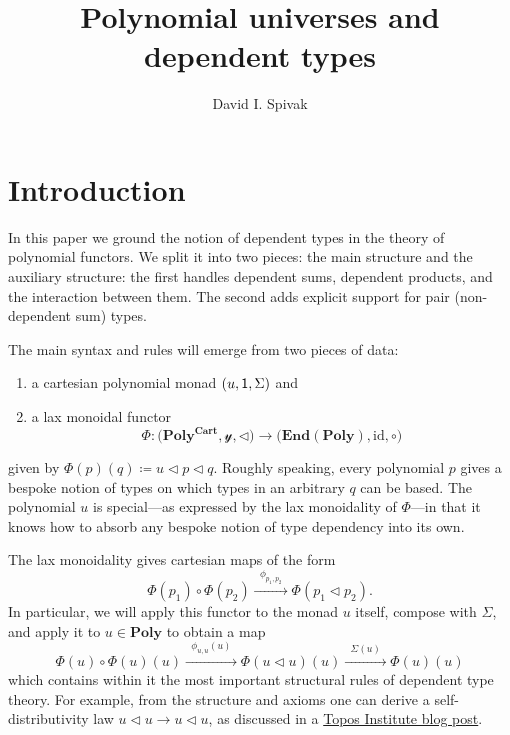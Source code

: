\documentclass[11pt, one side, article]{memoir}
\theoremstyle{definition}
\theoremstyle{plain}
\newcommand{\Cat}[1]{\mathbf{#1}}%
\newcommand{\id}{\mathrm{id}}
\newcommand{\too}{\longrightarrow}
\newcommand{\Too}[1]{\xrightarrow{\;\;#1\;\;}}
\newcommand{\en}{\Cat{End}}
\newcommand{\yon}{\mathcal{y}}
\newcommand{\poly}{\Cat{Poly}}
\newcommand{\polycart}{\poly^{\Cat{Cart}}}
\newcommand{\0}{\textsf{0}}
\newcommand{\1}{\tn{\textsf{1}}}
\newcommand{\tri}{\mathbin{\triangleleft}}
\begin{document}
\title{Polynomial universes and dependent types}

\author{David I. Spivak}

\date{\vspace{-.2in}}

\maketitle

\begin{abstract}
\end{abstract}


\chapter{Introduction}

In this paper we ground the notion of dependent types in the theory of polynomial functors. We split it into two pieces: the main structure and the auxiliary structure: the first handles dependent sums, dependent products, and the interaction between them. The second adds explicit support for pair (non-dependent sum) types. 

The main syntax and rules will emerge from two pieces of data:
\begin{enumerate}
	\item a cartesian polynomial monad $(u,\1,\Sigma)$ and
	\item a lax monoidal functor 
\[
	\Phi\colon\Big(\polycart,\yon,\tri\Big)\too\Big(\en(\poly),\id,\circ\Big)
\]
\end{enumerate}
given by $\Phi(p)(q)\coloneqq u\tri p\tri q$. Roughly speaking, every polynomial $p$ gives a bespoke notion of types on which types in an arbitrary $q$ can be based. The polynomial $u$ is special---as expressed by the lax monoidality of $\Phi$---in that it knows how to absorb any bespoke notion of type dependency into its own. 

The lax monoidality gives cartesian maps of the form 
\[
\Phi(p_1)\circ\Phi(p_2)
\Too{\phi_{p_1,p_2}}
\Phi(p_1\tri p_2).
\]
In particular, we will apply this functor to the monad $u$ itself, compose with $\Sigma$, and apply it to $u\in\poly$ to obtain a map
\begin{equation}\label{eqn.main}
  \Phi(u)\circ\Phi(u)(u)
  \Too{\phi_{u,u}(u)}
  \Phi(u\tri u)(u)
  \Too{\Sigma(u)}
  \Phi(u)(u)
\end{equation}
which contains within it the most important structural rules of dependent type theory. For example, from the structure and axioms one can derive a self-distributivity law $u\tri u\to u\tri u$, as discussed in a \href{https://topos.site/blog/2021/07/jump-monads-from-conjugation-to-dependent-types/}{Topos Institute blog post}.
\end{document}
